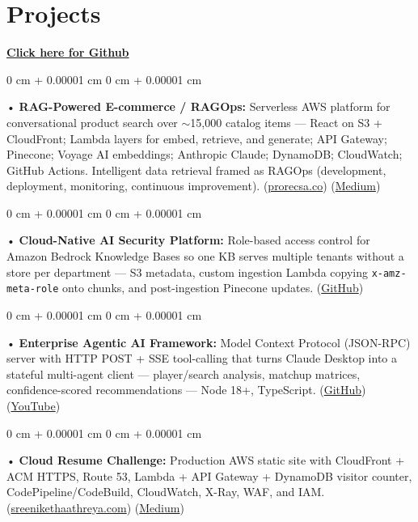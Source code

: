 \documentclass[10pt, letterpaper]{article}
\newenvironment{onecolentry}{
    \begin{adjustwidth}{
        0 cm + 0.00001 cm
    }{
        0 cm + 0.00001 cm
    }
}{
    \end{adjustwidth}
} %
\begin{document}
        \vspace{0.4cm}
\section{Projects}
    \vspace{2 pt}
\textbf{\href{https://github.com/daedalus-s}{Click here for Github}}
\begin{onecolentry}
     • \textbf{RAG-Powered E-commerce / RAGOps:} Serverless AWS platform for conversational product search over $\sim$15,000 catalog items --- React on S3 + CloudFront; Lambda layers for embed, retrieve, and generate; API Gateway; Pinecone; Voyage AI embeddings; Anthropic Claude; DynamoDB; CloudWatch; GitHub Actions. Intelligent data retrieval framed as RAGOps (development, deployment, monitoring, continuous improvement). (\href{https://prorecsa.co}{prorecsa.co}) (\href{https://medium.com/@sreenikethaathreya/from-rags-to-riches-bba8a671d5e6}{Medium})
\end{onecolentry}
\begin{onecolentry}
     • \textbf{Cloud-Native AI Security Platform:} Role-based access control for Amazon Bedrock Knowledge Bases so one KB serves multiple tenants without a store per department --- S3 metadata, custom ingestion Lambda copying \texttt{x-amz-meta-role} onto chunks, and post-ingestion Pinecone updates. (\href{https://github.com/daedalus-s/bedrock-acl-metadata}{GitHub})
\end{onecolentry}
\begin{onecolentry}
     • \textbf{Enterprise Agentic AI Framework:} Model Context Protocol (JSON-RPC) server with HTTP POST + SSE tool-calling that turns Claude Desktop into a stateful multi-agent client --- player/search analysis, matchup matrices, confidence-scored recommendations --- Node 18+, TypeScript. (\href{https://github.com/daedalus-s/dota2-mcp-server}{GitHub}) (\href{https://www.youtube.com/watch?v=op2gTYyFb5U}{YouTube})
\end{onecolentry}
\begin{onecolentry}
     • \textbf{Cloud Resume Challenge:} Production AWS static site with CloudFront + ACM HTTPS, Route 53, Lambda + API Gateway + DynamoDB visitor counter, CodePipeline/CodeBuild, CloudWatch, X-Ray, WAF, and IAM. (\href{https://sreenikethaathreya.com}{sreenikethaathreya.com}) (\href{https://medium.com/@sreenikethaathreya/cloud-resume-challenge-c4f17c3d53ff}{Medium})
\end{onecolentry}
\vspace{2 pt}
\end{document}
